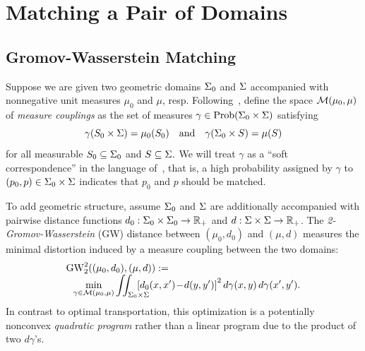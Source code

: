 
\section{Matching a Pair of Domains}\label{sec:matching}

\subsection{Gromov-Wasserstein Matching}\label{sec:gw_matching}

Suppose we are given two geometric domains $\Sigma_0$ and $\Sigma$ accompanied with %
nonnegative unit measures $\mu_0$ and $\mu$, resp.  Following~\cite{memoli-2011}, define the space $\mathcal M(\mu_0,\mu)$ of \emph{measure couplings} as the set of measures $\gamma\in\mathrm{Prob}(\Sigma_0\times \Sigma)$ satisfying
$$\gamma(S_0\times \Sigma)=\mu_0(S_0)\textrm{\ \ \  and\ \ \ }\gamma(\Sigma_0\times S)=\mu(S)$$
for all measurable $S_0\subseteq\Sigma_0$ and $S\subseteq\Sigma.$  We will treat $\gamma$ as a ``soft correspondence'' in the language of~\cite{solomon-2012}, that is, a high probability assigned by $\gamma$ to $(p_0,p)\in\Sigma_0\times\Sigma$ indicates that $p_0$ and $p$ should be matched.

To add geometric structure, assume $\Sigma_0$ and $\Sigma$ are additionally accompanied with pairwise distance functions $d_0:\Sigma_0\times\Sigma_0\rightarrow\mathbb{R}_+$ and $d:\Sigma\times\Sigma\rightarrow\mathbb{R}_+$.  The \emph{2-Gromov-Wasserstein} (GW) distance between $(\mu_0,d_0)$ and $(\mu,d)$ measures the minimal distortion induced by a measure coupling between the two domains:
\begin{equation}\label{eq:smooth_gw}
\begin{array}{l}\displaystyle
\GW_2^2((\mu_0,d_0),(\mu,d))\eqdef\\
\displaystyle
\hspace{.1in}
\min_{\gamma\in\M(\mu_0,\mu)}\iint_{\source\times\target} 
\hspace{-.2in}
\left[
d_0(x,x')\!-\!d(y,y')
\right]^2
d\gamma(x,y)\,d\gamma(x',y').
\end{array}
\end{equation}
In contrast to optimal transportation, this optimization is a potentially nonconvex \emph{quadratic program} rather than a linear program due to the product of two $d\gamma$'s.  

